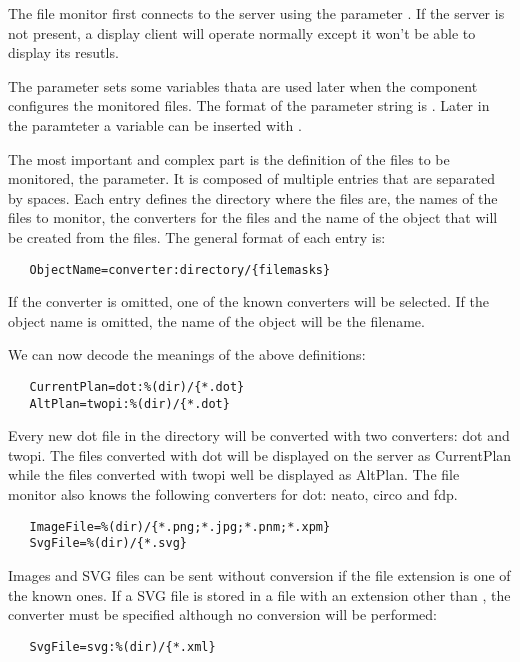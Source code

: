 The file monitor first connects to the server using the parameter
. If the server is not present, a display client will
operate normally except it won't be able to display its resutls.

The parameter  sets some variables thata are used later when
the component configures the monitored files. The format of the parameter
string is . Later in the paramteter
 a variable can be inserted with .

The most important and complex part is the definition of the files to be
monitored, the  parameter. It is composed of multiple entries
that are separated by spaces. Each entry defines the directory where the files
are, the names of the files to monitor, the converters for the files and the
name of the object that will be created from the files. The general format of
each entry is:
\begin{verbatim}
   ObjectName=converter:directory/{filemasks}
\end{verbatim}

If the converter is omitted, one of the known converters will be selected.
If the object name is omitted, the name of the object will be the filename.

We can now decode the meanings of the above definitions:

\begin{verbatim}
   CurrentPlan=dot:%(dir)/{*.dot}
   AltPlan=twopi:%(dir)/{*.dot}
\end{verbatim}

Every new dot file in the directory will be converted with two converters: dot
and twopi. The files converted with dot will be displayed on the server as
CurrentPlan while the files converted with twopi well be displayed as AltPlan.
The file monitor also knows the following converters for dot: neato, circo and
fdp.

\begin{verbatim}
   ImageFile=%(dir)/{*.png;*.jpg;*.pnm;*.xpm}
   SvgFile=%(dir)/{*.svg}
\end{verbatim}

Images and SVG files can be sent without conversion if the file extension is
one of the known ones. If a SVG file is stored in a file with an extension
other than , the converter must be specified although no conversion
will be performed:

\begin{verbatim}
   SvgFile=svg:%(dir)/{*.xml}
\end{verbatim}

